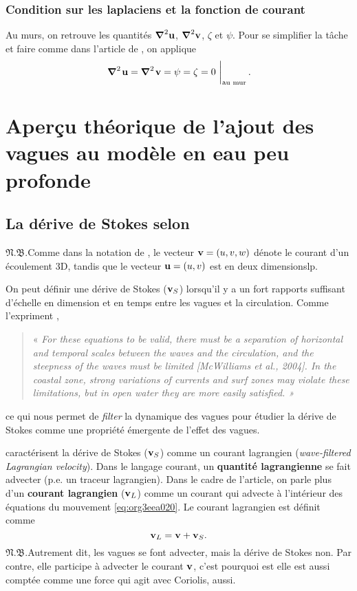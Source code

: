 \documentclass[10pt]{report}
\numberwithin{equation}{section}
\newcommand{\uu}{\vb{u}}
\newcommand{\vv}{\vb{v}}
\newcommand{\pt}{\hspace{1pt}} %
\newcommand{\nb}{\underline{{\footnotesize\EightStarConvex}\pt $\mathfrak{N.B.}$\vphantom{p}}\hspace{3pt}}
\begin{document}
\subsection{Condition sur les laplaciens et la fonction de courant}
\label{sec:org0eec0c2}
Au murs, on retrouve les quantités \(\gradient^2{\uu}\), \(\gradient^2{\vv}\), \(\zeta\) et \(\psi\).
Pour se simplifier la tâche et faire comme dans l'article de \autocite{duhaut2006}, on applique
\begin{equation}
   \eval{\gradient^2\pt\uu = \gradient^2\pt\vv = \psi = \zeta =  0\ }_\text{au mur}.
\end{equation}
\chapter{Aperçu théorique de l'ajout des vagues au modèle en eau peu profonde}
\label{sec:org40ad6d6}

\section{La dérive de Stokes selon }
\label{sec:org2022327}

\nb Comme dans la notation de \textcite{vallis_2006}, le vecteur \(\vv = \qty(u,v,w)\) dénote le courant d'un écoulement 3D, tandis que le vecteur \(\uu = (u,v)\) est en deux dimensionslp.\bigskip

On peut définir une dérive de Stokes (\(\vv_S\)) lorsqu'il y a un fort rapports suffisant d'échelle en dimension et en temps entre les vagues et la circulation.
Comme l'expriment \textcite[voir][pour un résumé]{suzuki2016understanding},\smallskip
\begin{quote}
« \emph{For these equations to be valid, there must be a separation of horizontal and temporal scales between the waves and the circulation, and the steepness of the waves must be limited [McWilliams et al., 2004].
In the coastal zone, strong variations of currents and surf zones may violate these limitations, but in open water they are more easily satisﬁed. »}\bigskip
\end{quote}
ce qui nous permet de \emph{filter} la dynamique des vagues pour étudier la dérive de Stokes comme une propriété émergente de l'effet des vagues. \bigskip

\textcite{suzuki2016understanding}  caractérisent la dérive de Stokes (\(\vv_S\)) comme un courant lagrangien (\emph{wave-ﬁltered Lagrangian velocity}).
Dans le langage courant, un \textbf{quantité lagrangienne} se fait advecter (p.e. un traceur lagrangien).
Dans le cadre de l'article, on parle plus d'un \textbf{courant lagrangien} (\(\vv_L\)) comme un courant qui advecte à l'intérieur des équations du mouvement \ref{eq:org3eea020}.
Le courant lagrangien est définit comme
\begin{equation}
   \vv_L = \vv + \vv_S.
\end{equation}
\nb Autrement dit, les vagues se font advecter, mais la dérive de Stokes non.
Par contre, elle participe à advecter le courant \(\vv\), c'est pourquoi est elle est aussi comptée comme une force qui agit avec Coriolis, aussi.
\end{document}
